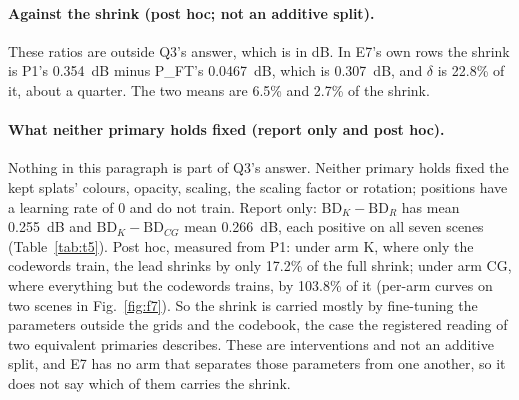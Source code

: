 \paragraph{Against the shrink (post hoc; not an additive split).}
These ratios are outside Q3's answer, which is in dB. %
In E7's own rows the shrink is P1's 0.354~dB minus P\_FT's 0.0467~dB, which is 0.307~dB, and $\delta$ is 22.8\% of it, about a quarter. %
The two means are 6.5\% and 2.7\% of the shrink. %

\paragraph{What neither primary holds fixed (report only and post hoc).}
Nothing in this paragraph is part of Q3's answer. %
Neither primary holds fixed the kept splats' colours, opacity, scaling, the scaling factor or rotation; positions have a learning rate of 0 and do not train. %
Report only: $\mathrm{BD}_K - \mathrm{BD}_R$ has mean 0.255~dB and $\mathrm{BD}_K - \mathrm{BD}_{CG}$ mean 0.266~dB, each positive on all seven scenes (Table~\ref{tab:t5}). %
Post hoc, measured from P1: under arm K, where only the codewords train, the lead shrinks by only 17.2\% of the full shrink; under arm CG, where everything but the codewords trains, by 103.8\% of it (per-arm curves on two scenes in Fig.~\ref{fig:f7}). %
So the shrink is carried mostly by fine-tuning the parameters outside the grids and the codebook, the case the registered reading of two equivalent primaries describes. %
These are interventions and not an additive split, and E7 has no arm that separates those parameters from one another, so it does not say which of them carries the shrink. %

